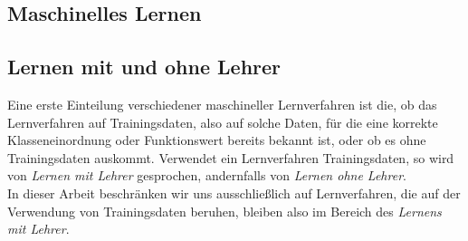 \documentclass[a4paper]{scrartcl}
\begin{document}
\begin{multicols}{2}
        \section{Maschinelles Lernen}
            
            \subsection{Lernen mit und ohne Lehrer}
                Eine erste Einteilung verschiedener maschineller Lernverfahren ist die, ob das Lernverfahren auf Trainingsdaten, also auf solche Daten, für die eine korrekte Klasseneinordnung oder Funktionswert bereits bekannt ist, oder ob es ohne Trainingsdaten auskommt. Verwendet ein Lernverfahren Trainingsdaten, so wird von \emph{Lernen mit Lehrer} gesprochen, andernfalls von \emph{Lernen ohne Lehrer}.\\
                In dieser Arbeit beschränken wir uns ausschließlich auf Lernverfahren, die auf der Verwendung von Trainingsdaten beruhen, bleiben also im Bereich des \emph{Lernens mit Lehrer}.

\end{multicols}
\end{document}
